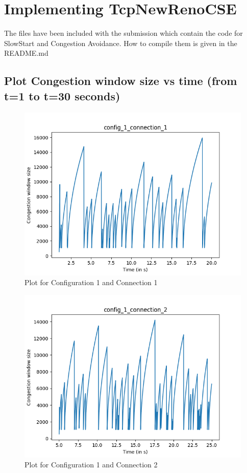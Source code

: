 \documentclass{article}
\begin{document}
\section{Implementing TcpNewRenoCSE}

The files have been included with the submission which contain the code for SlowStart and Congestion Avoidance. How to compile them is given in the README.md

\subsection{Plot Congestion window size vs time (from t=1 to t=30 seconds)}

\begin{figure}[H]
    \centering
    \includegraphics[scale = 0.8]{Q3/outputs/plots/config_1_connection_1.png}
    \caption{Plot for Configuration 1 and Connection 1}
\end{figure}

\begin{figure}[H]
    \centering
    \includegraphics[scale = 0.8]{Q3/outputs/plots/config_1_connection_2.png}
    \caption{Plot for Configuration 1 and Connection 2}
\end{figure}
\end{document}
